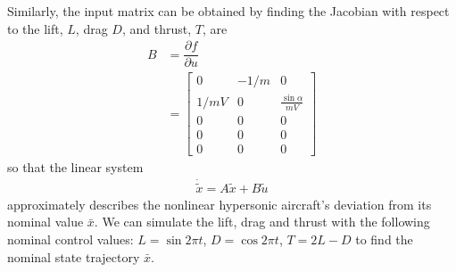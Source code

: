 \begin{example}
Similarly, the input matrix can be obtained by finding the Jacobian with respect to the lift, $L$, drag $D$, and thrust, $T$,  are
%
\begin{align}
	B &= \dfrac{\partial f}{\partial u} \\
	  &= \begin{bmatrix}
		  	0 & -1/m & 0 \\
		  	1/mV & 0 & \frac{\sin \alpha}{mV} \\
		  	0 & 0 & 0 \\
		  	0 & 0 & 0 \\
		  	0 & 0 & 0
	  \end{bmatrix}
\end{align}
%
so that the linear system 
\begin{align}
	\dot{\tilde{x}} = A \tilde{x} + B \tilde{u} 
\end{align}
%
approximately describes the nonlinear hypersonic aircraft's deviation from its nominal value $\bar{x}$. We can simulate the lift, drag and thrust with the following nominal control values: $L = \sin 2 \pi t$, $D= \cos 2\pi t$, $T = 2L - D$ to find the nominal state trajectory $\bar{x}$.
\end{example}